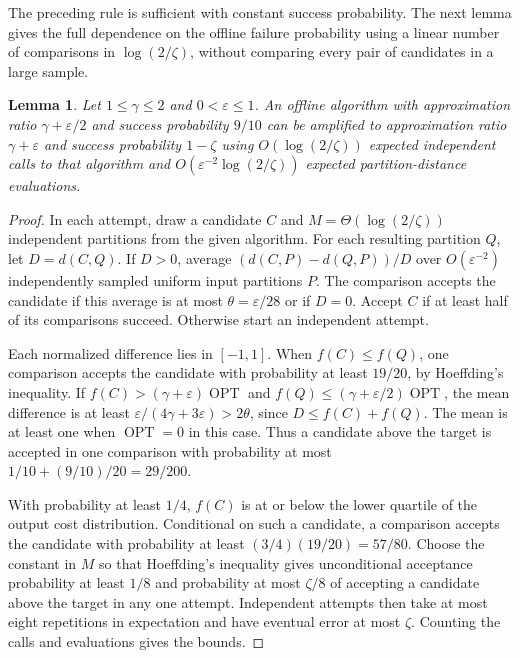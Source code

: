\documentclass[11pt]{article}
\newtheorem{lemma}[theorem]{Lemma}
\newcommand{\OPT}{\operatorname{OPT}}
\begin{document}
The preceding rule is sufficient with constant success probability. The next
lemma gives the full dependence on the offline failure probability using a linear number
of comparisons in $\log(2/\zeta)$, without comparing every pair of
candidates in a large sample.

\begin{lemma}\label{lem:offline-confidence}
Let $1\le\gamma\le2$ and $0<\varepsilon\le1$. An offline algorithm
with approximation ratio $\gamma+\varepsilon/2$ and success probability
$9/10$ can be amplified to approximation ratio $\gamma+\varepsilon$
and success probability $1-\zeta$ using
$O(\log(2/\zeta))$ expected independent calls to that algorithm and
$O(\varepsilon^{-2}\log(2/\zeta))$ expected partition-distance
evaluations.
\end{lemma}
\begin{proof}
In each attempt, draw a candidate $C$ and $M=\Theta(\log(2/\zeta))$
independent partitions from the given algorithm. For each resulting partition $Q$, let
$D=d(C,Q)$. If $D>0$, average
$(d(C,P)-d(Q,P))/D$ over $O(\varepsilon^{-2})$ independently sampled
uniform input partitions $P$. The comparison accepts the candidate
if this average is at most $\theta=\varepsilon/28$ or if $D=0$.
Accept $C$ if at least half of its comparisons succeed. Otherwise
start an independent attempt.

Each normalized difference lies in $[-1,1]$. When $f(C)\le f(Q)$,
one comparison accepts the candidate with probability at least $19/20$, by
Hoeffding's inequality. If $f(C)>(\gamma+\varepsilon)\OPT$ and
$f(Q)\le(\gamma+\varepsilon/2)\OPT$, the mean difference is at least
$\varepsilon/(4\gamma+3\varepsilon)>2\theta$, since
$D\le f(C)+f(Q)$. The mean is at least one when $\OPT=0$ in this
case. Thus a candidate above the target is accepted in one comparison
with probability at most $1/10+(9/10)/20=29/200$.

With probability at least $1/4$, $f(C)$ is at or below the lower
quartile of the output cost distribution. Conditional on such a
candidate, a comparison accepts the candidate with probability at least
$(3/4)(19/20)=57/80$. Choose the constant in $M$ so that
Hoeffding's inequality gives unconditional acceptance probability
at least $1/8$ and probability at most $\zeta/8$ of accepting a
candidate above the target in any one attempt. Independent attempts
then take at most eight repetitions in expectation and have eventual
error at most $\zeta$. Counting the calls and evaluations gives the
bounds.
\end{proof}
\end{document}
